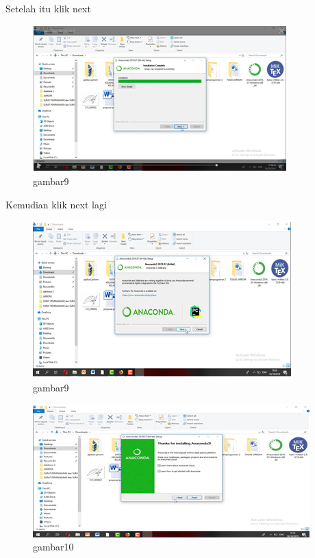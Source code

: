 Setelah itu klik next
\begin{figure}[h]
\centering
    \includegraphics[scale=0.9]{section/8.png}
\caption{gambar9}
\label{fig:my_label}
\end{figure}

Kemudian klik next lagi
\begin{figure}[h]
\centering
    \includegraphics[scale=0.9]{section/9.png}
\caption{gambar9}
\label{fig:my_label}
\end{figure}


\begin{figure}[h]
\centering
    \includegraphics[scale=0.9]{section/10.png}
\caption{gambar10}
\label{fig:my_label}
\end{figure}


